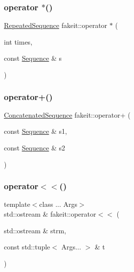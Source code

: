 \subsubsection{\texorpdfstring{operator $\ast$()}{operator *()}\hspace{0.1cm}{\footnotesize\ttfamily [2/2]}}
{\footnotesize\ttfamily \mbox{\hyperlink{classfakeit_1_1RepeatedSequence}{Repeated\+Sequence}} fakeit\+::operator $\ast$ (\begin{DoxyParamCaption}\item[{int}]{times,  }\item[{const \mbox{\hyperlink{classfakeit_1_1Sequence}{Sequence}} \&}]{s }\end{DoxyParamCaption})\hspace{0.3cm}{\ttfamily [inline]}}

\mbox{\label{namespacefakeit_a30256848f1ee4d59abebaeaf6534a236}} 
\subsubsection{\texorpdfstring{operator+()}{operator+()}}
{\footnotesize\ttfamily \mbox{\hyperlink{classfakeit_1_1ConcatenatedSequence}{Concatenated\+Sequence}} fakeit\+::operator+ (\begin{DoxyParamCaption}\item[{const \mbox{\hyperlink{classfakeit_1_1Sequence}{Sequence}} \&}]{s1,  }\item[{const \mbox{\hyperlink{classfakeit_1_1Sequence}{Sequence}} \&}]{s2 }\end{DoxyParamCaption})\hspace{0.3cm}{\ttfamily [inline]}}

\mbox{\label{namespacefakeit_a6042567070d19762ad715be75065d943}} 
\subsubsection{\texorpdfstring{operator$<$$<$()}{operator<<()}\hspace{0.1cm}{\footnotesize\ttfamily [1/2]}}
{\footnotesize\ttfamily template$<$class ... Args$>$ \\
std\+::ostream \& fakeit\+::operator$<$$<$ (\begin{DoxyParamCaption}\item[{std\+::ostream \&}]{strm,  }\item[{const std\+::tuple$<$ Args... $>$ \&}]{t }\end{DoxyParamCaption})}

